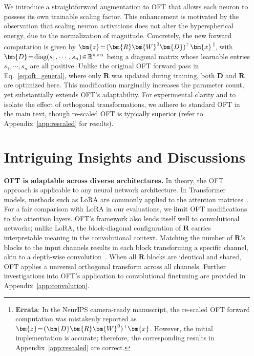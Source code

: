 We introduce a straightforward augmentation to OFT that allows each neuron to possess its own trainable scaling factor. This enhancement is motivated by the observation that scaling neuron activations does not alter the hyperspherical energy, due to the normalization of magnitude. Concretely, the new forward computation is given by $\thickmuskip=2mu \medmuskip=2mu\bm{z}=(\bm{R}\bm{W}^0\bm{D})^\top\bm{x}$\footnote{\textbf{Errata}: In the NeurIPS camera-ready manuscript, the re-scaled OFT forward computation was mistakenly reported as $\thickmuskip=2mu \medmuskip=2mu\bm{z}=(\bm{D}\bm{R}\bm{W}^0)^\top\bm{x}$. However, the initial implementation is accurate; therefore, the corresponding results in Appendix~\ref{app:rescaled} are correct.}, with $\thickmuskip=2mu \medmuskip=2mu \bm{D}=\text{diag}(s_1,\cdots,s_n)\in\mathbb{R}^{n\times n}$ being a diagonal matrix whose learnable entries $s_1,\cdots,s_n$ are all positive. Unlike the original OFT forward pass in Eq.~\eqref{eq:oft_general}, where only $\bm{R}$ was updated during training, both $\bm{D}$ and $\bm{R}$ are optimized here. This modification marginally increases the parameter count, yet substantially extends OFT's adaptability. For experimental clarity and to isolate the effect of orthogonal transformations, we adhere to standard OFT in the main text, though re-scaled OFT is typically superior (refer to Appendix~\ref{app:rescaled} for results).

\section{Intriguing Insights and Discussions}

\textbf{OFT is adaptable across diverse architectures.} In theory, the OFT approach is applicable to any neural network architecture. In Transformer models, methods such as LoRA are commonly applied to the attention matrices~\cite{hulora2022}. For a fair comparison with LoRA in our evaluations, we limit OFT modifications to the attention layers. OFT's framework also lends itself well to convolutional networks; unlike LoRA, the block-diagonal configuration of $\bm{R}$ carries interpretable meaning in the convolutional context. Matching the number of $\bm{R}$'s blocks to the input channels results in each block transforming a specific channel, akin to a depth-wise convolution~\cite{chollet2017xception}. When all $\bm{R}$ blocks are identical and shared, OFT applies a universal orthogonal transform across all channels. Further investigations into OFT's application to convolutional finetuning are provided in Appendix~\ref{app:convolution}.

